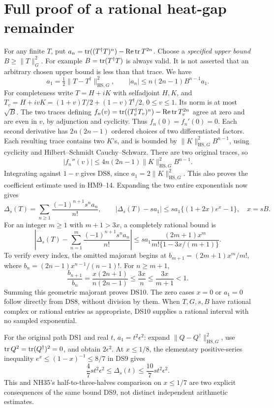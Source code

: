 \section{Full proof of a rational heat-gap remainder}
For any finite \(T\), put \(a_n=\operatorname{tr}((T^\dagger T)^n)-\operatorname{Re}\operatorname{tr} T^{2n}\).
Choose a \emph{specified upper bound} \(B\ge\|T\|_G^2\).
For example \(B=\operatorname{tr}(T^\dagger T)\) is always valid. It is not asserted
that an arbitrary chosen upper bound is less than that trace.
We have
\[
 a_1=\tfrac12\|T-T^\dagger\|_{\mathrm{HS},G}^2,\qquad
 |a_n|\le n(2n-1)B^{n-1}a_1 .
 \tag{DS8}
\]
For completeness write \(T=H+iK\) with selfadjoint \(H,K\), and
\(T_v=H+ivK=(1+v)T/2+(1-v)T^\dagger/2\), \(0\le v\le1\).
Its norm is at most \(\sqrt B\).
The two traces defining
\(f_n(v)=\operatorname{tr}((T_v^\dagger T_v)^n)-\operatorname{Re}\operatorname{tr} T_v^{2n}\)
agree at zero and are even in \(v\), by adjunction and cyclicity.
Thus \(f_n(0)=f_n'(0)=0\).
Each second derivative has \(2n(2n-1)\) ordered choices of two
differentiated factors. Each resulting trace contains two \(K\)'s,
and is bounded by
\(\|K\|_{\mathrm{HS},G}^2B^{n-1}\), using cyclicity and
Hilbert--Schmidt Cauchy--Schwarz. There are two original traces, so
\[
 |f_n''(v)|\le4n(2n-1)\|K\|_{\mathrm{HS},G}^2 B^{n-1}.
\]
Integrating against \(1-v\) gives DS8, since
\(a_1=2\|K\|_{\mathrm{HS},G}^2\).
This also proves the coefficient estimate used in HM9--14.
Expanding the two entire exponentials now gives
\[
 \Delta_s(T)=\sum_{n\ge1}\frac{(-1)^{n+1}s^na_n}{n!},
 \qquad
 |\Delta_s(T)-sa_1|\le sa_1\{(1+2x)e^x-1\},\quad x=sB.
 \tag{DS9}
\]
For an integer \(m\ge1\) with \(m+1>3x\), a completely rational bound is
\[
 \left|\Delta_s(T)-\sum_{n=1}^m
             \frac{(-1)^{n+1}s^na_n}{n!}\right|
 \le sa_1\frac{(2m+1)x^m}{m!\{1-3x/(m+1)\}} .
 \tag{DS10}
\]
To verify every index, the omitted majorant begins at
\(b_{m+1}=(2m+1)x^m/m!\), where
\(b_n=(2n-1)x^{n-1}/(n-1)!\).
For \(n\ge m+1\),
\[
 \frac{b_{n+1}}{b_n}
 =\frac{x(2n+1)}{n(2n-1)}
 \le\frac{3x}{n}\le\frac{3x}{m+1}<1.
\]
Summing this geometric majorant proves DS10. The zero cases \(x=0\)
or \(a_1=0\) follow directly from DS8, without division by them.
When \(T,G,s,B\) have rational complex or rational entries as appropriate,
DS10 supplies a rational interval with no sampled exponential.

For the original path DS1 and real \(t\), \(a_1=t^2\epsilon^2\):
expand \(\|Q-Q^\dagger\|_{\mathrm{HS},G}^2\), use
\(\operatorname{tr} Q^2=\operatorname{tr}(Q^\dagger)^2=0\), and obtain \(2\epsilon^2\).
At \(x\le1/8\), the elementary positive-series inequality
\(e^x\le(1-x)^{-1}\le8/7\) in DS9 gives
\[
 \frac47 st^2\epsilon^2\le\Delta_s(t)
 \le\frac{10}{7}st^2\epsilon^2 .
 \tag{DS11}
\]
This and NH35's half-to-three-halves comparison on \(x\le1/7\)
are two explicit consequences of the same bound DS9, not distinct
independent arithmetic estimates.

